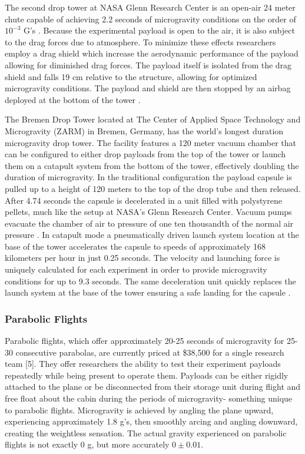 The second drop tower at NASA Glenn Research Center is an open-air 24 meter chute capable of achieving 2.2 seconds of microgravity conditions on the order of $10^{\minus 3}$ G's \cite{JAXALabs}. Because the experimental payload is open to the air, it is also subject to the drag forces due to atmosphere. To minimize these effects researchers employ a drag shield which increase the aerodynamic performance of the payload allowing for diminished drag forces. The payload itself is isolated from the drag shield and falls 19 cm relative to the structure, allowing for optimized microgravity conditions. The payload and shield are then stopped by an airbag deployed at the bottom of the tower \cite{NASADropTower}. 

The Bremen Drop Tower located at The Center of Applied Space Technology and Microgravity (ZARM) in Bremen, Germany, has the world's longest duration microgravity drop tower. The facility features a 120 meter vacuum chamber that can be configured to either drop payloads from the top of the tower or launch them on a catapult system from the bottom of the tower, effectively doubling the duration of microgravity. In the traditional configuration the payload capsule is pulled up to a height of 120 meters to the top of the drop tube and then released. After 4.74 seconds the capsule is decelerated in a unit filled with polystyrene pellets, much like the setup at NASA's Glenn Research Center. Vacuum pumps evacuate the chamber of air to pressure of one ten thousandth of the normal air pressure \cite{ZARM}. In catapult mode a pneumatically driven launch system location at the base of the tower accelerates the capsule to speeds of approximately 168 kilometers per hour in just 0.25 seconds. The velocity and launching force is uniquely calculated for each experiment in order to provide microgravity conditions for up to 9.3 seconds. The same deceleration unit quickly replaces the launch system at the base of the tower ensuring a safe landing for the capsule \cite{ZARM}. 


\subsubsection{Parabolic Flights}

\indent\indent Parabolic flights, which offer approximately 20-25 seconds of microgravity for 25-30 consecutive parabolas, are currently priced at \$38,500 for a single research team [5]. They offer researchers the ability to test their experiment payloads repeatedly while being present to operate them. Payloads can be either rigidly attached to the plane or be disconnected from their storage unit during flight and free float about the cabin during the periods of microgravity- something unique to parabolic flights. Microgravity is achieved by angling the plane upward, experiencing approximately 1.8 g's,  then smoothly arcing and angling downward, creating the weightless sensation. The actual gravity experienced on parabolic flights is not exactly 0 g, but more accurately $0 \pm 0.01$.

